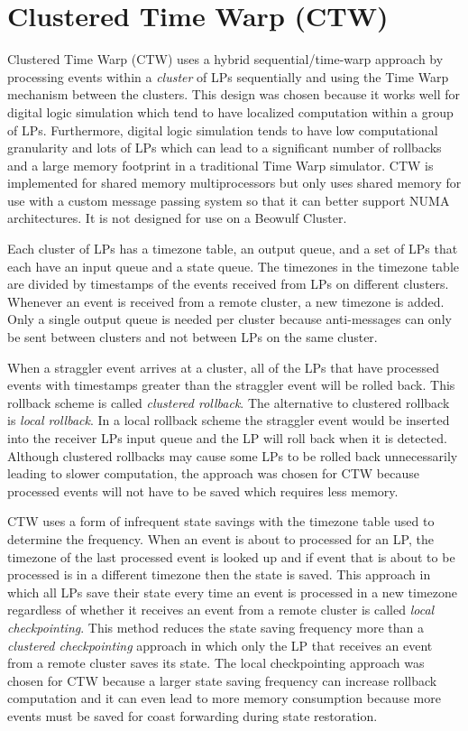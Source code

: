 \documentclass[11pt]{book}
\begin{document}
\section{Clustered Time Warp (CTW)}

Clustered Time Warp \cite{avril-95} (CTW) uses a hybrid sequential/time-warp approach by processing
events within a \emph{cluster} of LPs sequentially and using the Time Warp mechanism between the
clusters.  This design was chosen because it works well for digital logic simulation which tend to
have localized computation within a group of LPs.  Furthermore, digital logic simulation tends to
have low computational granularity and lots of LPs which can lead to a significant number of
rollbacks and a large memory footprint in a traditional Time Warp simulator.  CTW is implemented for
shared memory multiprocessors but only uses shared memory for use with a custom message passing
system so that it can better support NUMA architectures.  It is not designed for use on a Beowulf
Cluster.

Each cluster of LPs has a timezone table, an output queue, and a set of LPs that each have an input
queue and a state queue.  The timezones in the timezone table are divided by timestamps of the
events received from LPs on different clusters.  Whenever an event is received from a remote
cluster, a new timezone is added.  Only a single output queue is needed per cluster because
anti-messages can only be sent between clusters and not between LPs on the same cluster.

When a straggler event arrives at a cluster, all of the LPs that have processed events with
timestamps greater than the straggler event will be rolled back.  This rollback scheme is called
\emph{clustered rollback}.  The alternative to clustered rollback is \emph{local rollback}.  In a
local rollback scheme the straggler event would be inserted into the receiver LPs input queue and
the LP will roll back when it is detected.  Although clustered rollbacks may cause some LPs to be
rolled back unnecessarily leading to slower computation, the approach was chosen for CTW because
processed events will not have to be saved which requires less memory.

CTW uses a form of infrequent state savings with the timezone table used to determine the frequency.
When an event is about to processed for an LP, the timezone of the last processed event is looked up
and if event that is about to be processed is in a different timezone then the state is saved.  This
approach in which all LPs save their state every time an event is processed in a new timezone
regardless of whether it receives an event from a remote cluster is called \emph{local
  checkpointing}.  This method reduces the state saving frequency more than a \emph{clustered
  checkpointing} approach in which only the LP that receives an event from a remote cluster saves
its state.  The local checkpointing approach was chosen for CTW because a larger state saving
frequency can increase rollback computation and it can even lead to more memory consumption because
more events must be saved for coast forwarding during state restoration.
\end{document}
